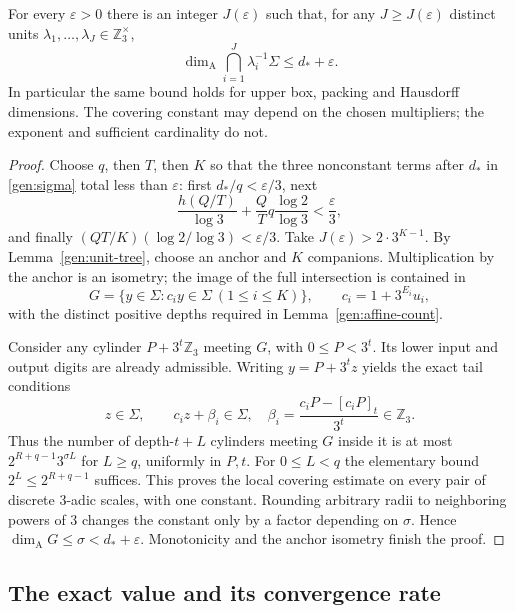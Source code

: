 \begin{theorem}\label{gen:finite-uniform}
For every $\varepsilon>0$ there is an integer $J(\varepsilon)$ such
that, for any $J\ge J(\varepsilon)$ distinct units
$\lambda_1,\ldots,\lambda_J\in\mathbb Z_3^\times$,
\[
 \dim_{\mathrm A}\bigcap_{i=1}^J\lambda_i^{-1}\Sigma
                \le d_*+\varepsilon.
\]
In particular the same bound holds for upper box, packing and
Hausdorff dimensions.  The covering constant may depend on the
chosen multipliers; the exponent and sufficient cardinality do not.
\end{theorem}
\begin{proof}
Choose $q$, then $T$, then $K$ so that the three nonconstant terms
after $d_*$ in \eqref{gen:sigma} total less than $\varepsilon$:
first $d_*/q<\varepsilon/3$, next
\[
 \frac{h(Q/T)}{\log3}+\frac QT q\frac{\log2}{\log3}
              <\frac\varepsilon3,
\]
and finally $(QT/K)(\log2/\log3)<\varepsilon/3$.
Take $J(\varepsilon)>2\cdot3^{K-1}$.  By
Lemma~\ref{gen:unit-tree}, choose an anchor and $K$ companions.
Multiplication by the anchor is an isometry; the image of the full
intersection is contained in
\[
 G=\{y\in\Sigma:c_i y\in\Sigma\ (1\le i\le K)\},
       \qquad c_i=1+3^{E_i}u_i,
\]
with the distinct positive depths required in
Lemma~\ref{gen:affine-count}.

Consider any cylinder $P+3^t\mathbb Z_3$ meeting $G$, with
$0\le P<3^t$.  Its lower input and output digits are already
admissible.  Writing $y=P+3^tz$ yields the exact tail conditions
\[
 z\in\Sigma,\qquad c_i z+\beta_i\in\Sigma,
       \quad\beta_i=\frac{c_iP-[c_iP]_t}{3^t}\in\mathbb Z_3.
\]
Thus the number of depth-$t+L$ cylinders meeting $G$ inside it is
at most $2^{R+q-1}3^{\sigma L}$ for $L\ge q$, uniformly in $P,t$.
For $0\le L<q$ the elementary bound $2^L\le2^{R+q-1}$ suffices.
This proves the local covering estimate on every pair of discrete
$3$-adic scales, with one constant.  Rounding arbitrary radii to
neighboring powers of $3$ changes the constant only by a factor
depending on $\sigma$.  Hence $\dim_{\mathrm A}G\le\sigma<d_*+
\varepsilon$.  Monotonicity and the anchor isometry finish the proof.
\end{proof}

\subsection{The exact value and its convergence rate}


